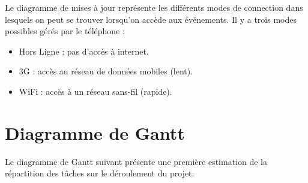 \documentclass [pdftex,12pt] {report}
\begin{document}
Le diagramme de mises à jour représente les différents modes de connection dans lesquels on peut se trouver lorsqu'on accède aux événements. Il y a trois modes possibles gérés par le téléphone :\\
\begin{itemize}
\renewcommand{\labelitemi}{$\bullet$}
 \item Hors Ligne : pas d'accès à internet.
 \item 3G :  accès au réseau de données mobiles (lent).
 \item WiFi : accès à un réseau sans-fil (rapide).
\end{itemize}

\section{Diagramme de Gantt}
Le diagramme de Gantt suivant présente une première estimation de la répartition des tâches sur le déroulement du projet.
\end{document}
